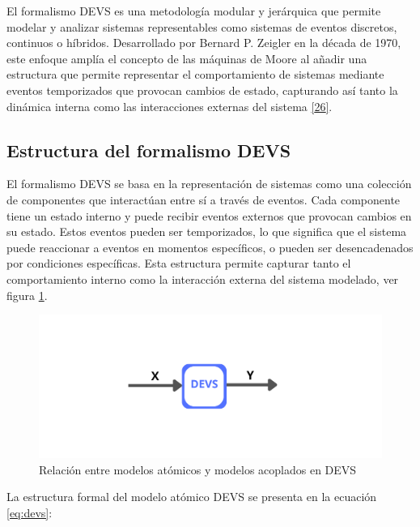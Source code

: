 \documentclass[12pt,oneside]{templates/unerthesis}
\begin{document}
El formalismo DEVS es una metodología modular y jerárquica que permite modelar y analizar sistemas representables como sistemas de eventos discretos, continuos o híbridos. Desarrollado por Bernard P. Zeigler en la década de 1970, este enfoque amplía el concepto de las máquinas de Moore al añadir una estructura que permite representar el comportamiento de sistemas mediante eventos temporizados que provocan cambios de estado, capturando así tanto la dinámica interna como las interacciones externas del sistema \protect\hyperlink{ref-zeigler_theory_2000}{{[}26{]}}.

\hypertarget{estructura-del-formalismo-devs}{%
\subsection{Estructura del formalismo DEVS}\label{estructura-del-formalismo-devs}}

El formalismo DEVS se basa en la representación de sistemas como una colección de componentes que interactúan entre sí a través de eventos. Cada componente tiene un estado interno y puede recibir eventos externos que provocan cambios en su estado. Estos eventos pueden ser temporizados, lo que significa que el sistema puede reaccionar a eventos en momentos específicos, o pueden ser desencadenados por condiciones específicas.
Esta estructura permite capturar tanto el comportamiento interno como la interacción externa del sistema modelado, ver figura \ref{fig:devs}.

\begin{figure}

{\centering \includegraphics[width=1\linewidth]{images/devs} 

}

\caption{Relación entre modelos atómicos y modelos acoplados en DEVS}\label{fig:devs}
\end{figure}

La estructura formal del modelo atómico DEVS se presenta en la ecuación \eqref{eq:devs}:
\end{document}
